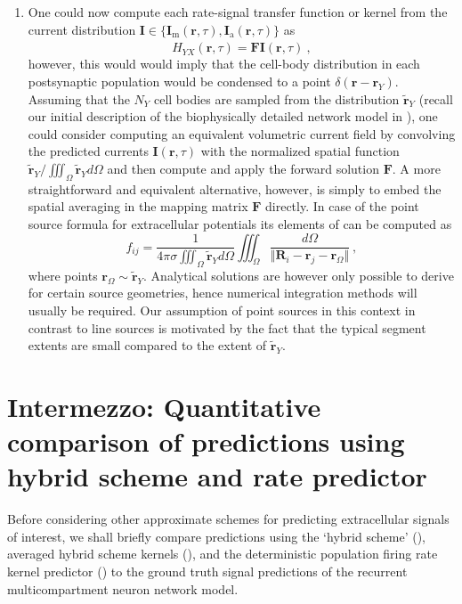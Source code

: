 \begin{enumerate}
\item One could now compute each rate-signal transfer function or kernel from the current distribution
$\mathbf{I} \in \{ \mathbf{I}_\mathrm{m}(\mathbf{r}, \tau), \mathbf{I}_\mathrm{a}(\mathbf{r}, \tau) \}$ as
\begin{equation}
\hat{H}_{YX}(\mathbf{r}, \tau) = \mathbf{F}\mathbf{I}(\mathbf{r}, \tau) ~,
\end{equation}
however, this would would imply that the cell-body distribution in each postsynaptic population would be condensed to a point $\delta(\mathbf{r} - \mathbf{r}_Y)$.
Assuming that the $N_Y$ cell bodies are sampled from the distribution $\widetilde{\mathbf{r}}_Y$
(recall our initial description of the biophysically detailed network model in ),
one could consider computing an equivalent volumetric current field by convolving the predicted currents $\mathbf{I}(\mathbf{r}, \tau)$ with the normalized spatial function
$\widetilde{\mathbf{r}}_Y / \iiint_\Omega \widetilde{\mathbf{r}}_Y d\Omega$
and then compute and apply the forward solution $\mathbf{F}$.
A more straightforward and equivalent alternative, however,
is simply to embed the spatial averaging in the mapping matrix $\mathbf{F}$ directly.
In case of the point source formula for extracellular potentials its elements of can be computed as
\begin{equation}
f_{ij} = \frac{1}{4 \pi \sigma \iiint_\Omega \widetilde{\mathbf{r}}_Y d\Omega}
	\iiint_\Omega \frac{d\Omega}{\Vert \mathbf{R}_i - \mathbf{r}_j - \mathbf{r}_\Omega \Vert}~, 
\end{equation}
where points $\mathbf{r}_\Omega \sim \widetilde{\mathbf{r}}_Y$. 
Analytical solutions are however only possible to derive for certain source geometries, 
hence numerical integration methods will usually be required. 
Our assumption of point sources in this context in contrast to line sources is motivated by the fact that the typical segment extents are small compared to the extent of $\widetilde{\mathbf{r}}_Y$.

\end{enumerate}


\section{Intermezzo: Quantitative comparison of predictions using hybrid scheme and rate predictor}
\label{sec:Schemes:comparison}

Before considering other approximate schemes for predicting extracellular signals of interest, 
we shall briefly compare predictions using the `hybrid scheme' (),
averaged hybrid scheme kernels (),
and the deterministic population firing rate kernel predictor () to the ground truth signal predictions of the recurrent multicompartment neuron network model. 

